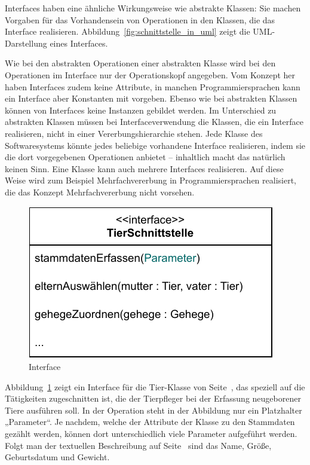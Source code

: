 \vspace{\baselineskip} %

Interfaces haben eine ähnliche Wirkungsweise wie abstrakte Klassen: Sie machen Vorgaben für das Vorhandensein von Operationen in den Klassen, die das Interface realisieren. Abbildung~\ref{fig:schnittstelle_in_uml} zeigt die UML-Darstellung eines Interfaces. 

Wie bei den abstrakten Operationen einer abstrakten Klasse wird bei den Operationen im Interface nur der Operationskopf angegeben. Vom Konzept her haben Interfaces zudem keine Attribute, in manchen Programmiersprachen kann ein Interface aber Konstanten mit vorgeben. Ebenso wie bei abstrakten Klassen können von Interfaces keine Instanzen gebildet werden. Im Unterschied zu abstrakten Klassen müssen bei Interfaceverwendung die Klassen, die ein Interface realisieren, nicht in einer Vererbungshierarchie stehen. Jede Klasse des Softwaresystems könnte jedes beliebige vorhandene Interface realisieren, indem sie die dort vorgegebenen Opera\-tionen anbietet -- inhaltlich macht das natürlich keinen Sinn. Eine Klasse kann auch mehrere Interfaces realisieren. Auf diese Weise wird zum Beispiel Mehrfach\-vererbung in Programmiersprachen realisiert, die das Konzept Mehrfachvererbung nicht vor\-sehen.

\vspace{\baselineskip} %

\begin{figure}[h!]
	\centering
	\includegraphics[scale=1.0]{Bilder/Kapitel-8/interface_tier.pdf}
	\caption{Interface }
	\label{fig:interface_tier}
\end{figure}

\vspace{\baselineskip} %

Abbildung~\ref{fig:interface_tier} zeigt ein Interface für die Tier-Klasse von Seite~\pageref{sec:Kap-8.2:Tierklasse}, das speziell auf die Tätigkeiten zugeschnitten ist, die der Tierpfleger bei der Erfassung neu\-geborener Tiere ausführen soll. In der Operation  steht in der Abbildung nur ein Platzhalter „Parameter“. Je nachdem, welche der Attribute der Klasse  zu den Stammdaten gezählt werden, können dort unterschiedlich viele Parameter aufgeführt werden. Folgt man der textuellen Beschreibung auf Seite~\pageref{sec:Kap-8.2:Tiererfassung} sind das Name, Größe, Geburtsdatum und Gewicht.

